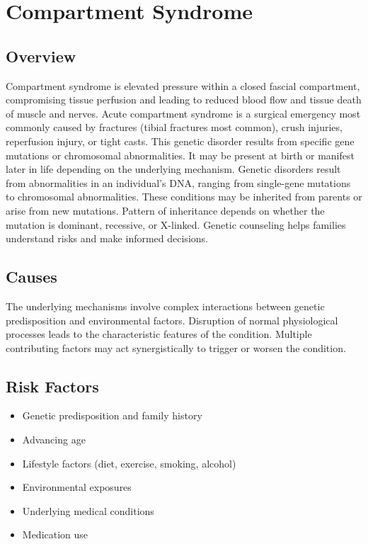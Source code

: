 \chapter{Compartment Syndrome}
\label{sec:Compartment Syndrome}

\section{Overview}
Compartment syndrome is elevated pressure within a closed fascial compartment, compromising tissue perfusion and leading to reduced blood flow and tissue death of muscle and nerves. Acute compartment syndrome is a surgical emergency most commonly caused by fractures (tibial fractures most common), crush injuries, reperfusion injury, or tight casts. This genetic disorder results from specific gene mutations or chromosomal abnormalities. It may be present at birth or manifest later in life depending on the underlying mechanism. Genetic disorders result from abnormalities in an individual's DNA, ranging from single-gene mutations to chromosomal abnormalities. These conditions may be inherited from parents or arise from new mutations. Pattern of inheritance depends on whether the mutation is dominant, recessive, or X-linked. Genetic counseling helps families understand risks and make informed decisions.
\section{Causes}
The underlying mechanisms involve complex interactions between genetic predisposition and environmental factors. Disruption of normal physiological processes leads to the characteristic features of the condition. Multiple contributing factors may act synergistically to trigger or worsen the condition.
\section{Risk Factors}


\begin{itemize}[noitemsep]
  \item Genetic predisposition and family history
  \item Advancing age
  \item Lifestyle factors (diet, exercise, smoking, alcohol)
  \item Environmental exposures
  \item Underlying medical conditions
  \item Medication use
\end{itemize}
